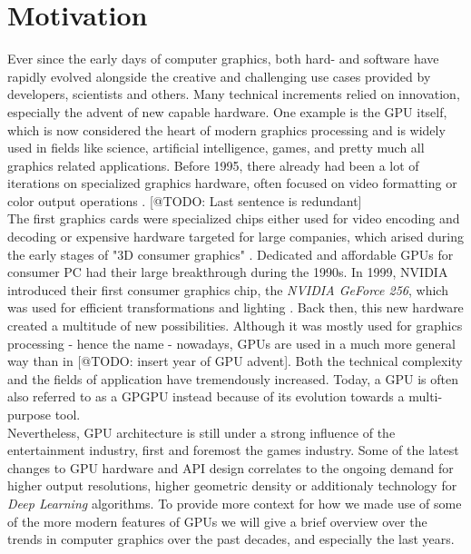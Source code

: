 \chapter{Motivation} \label{cpt-motivation}


Ever since the early days of computer graphics, both hard- and software have rapidly evolved
alongside the creative and challenging use cases provided by developers, scientists and others.
Many technical increments relied on innovation, especially the advent of new capable hardware.
One example is the \ac{GPU} itself, which is now considered the heart of modern graphics 
processing and is widely used in fields like science, artificial intelligence, games, and pretty 
much all graphics related applications. Before 1995, there already had been a lot of iterations 
on specialized graphics hardware, often focused on video formatting or color output operations
\cite{Singer2023}. [@TODO: Last sentence is redundant]\\

\noindent
The first graphics cards were specialized chips either used for video encoding and decoding
or expensive hardware targeted for large companies, which arised during the early stages 
of "3D consumer graphics" \cite{Singer2023}. Dedicated and affordable \ac{GPU}s for consumer 
\ac{PC} had their large breakthrough during the 1990s. In 1999, NVIDIA introduced their 
first consumer graphics chip, the \emph{NVIDIA GeForce 256}, which was used for efficient 
transformations and lighting \cite{Fenno2024}. Back then, this new hardware created a multitude 
of new possibilities. 
Although it was mostly used for graphics processing - hence the name - nowadays, \ac{GPU}s
are used in a much more general way than in [@TODO: insert year of GPU advent]. Both the 
technical complexity and the fields of application have tremendously increased. Today, a 
\ac{GPU} is often also referred to as a \ac{GPGPU} instead because of its evolution towards 
a multi-purpose tool. \\

\noindent
Nevertheless, \ac{GPU} architecture is still under a strong influence of the entertainment 
industry, first and foremost the games industry. Some of the latest changes to \ac{GPU} 
hardware and \ac{API} design correlates to the ongoing demand for higher output resolutions, 
higher geometric density or additionaly technology for \emph{Deep Learning} algorithms. 
To provide more context for how we made use of some of the more modern features of \ac{GPU}s 
we will give a brief overview over the trends in computer graphics over the past decades, and 
especially the last years.


